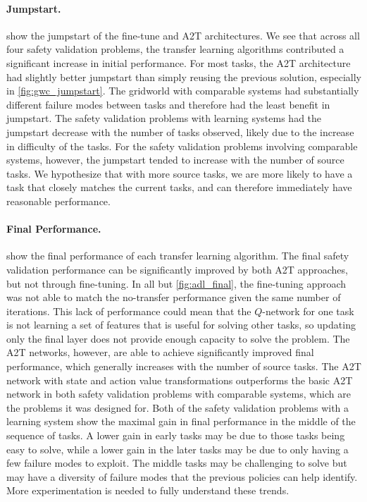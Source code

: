 \paragraph{Jumpstart.}
 show the jumpstart of the fine-tune and A2T architectures. We see that across all four safety validation problems, the transfer learning algorithms contributed a significant increase in initial performance. For most tasks, the A2T architecture had slightly better jumpstart than simply reusing the previous solution, especially in \cref{fig:gwc_jumpstart}. The gridworld with comparable systems had substantially different failure modes between tasks and therefore had the least benefit in jumpstart.  The safety validation problems with learning systems had the jumpstart decrease with the number of tasks observed, likely due to the increase in difficulty of the tasks. For the safety validation problems involving comparable systems, however, the jumpstart tended to increase with the number of source tasks. We hypothesize that with more source tasks, we are more likely to have a task that closely matches the current tasks, and can therefore immediately have reasonable performance. 

\paragraph{Final Performance.}
 show the final performance of each transfer learning algorithm. The final safety validation performance can be significantly improved by both A2T approaches, but not through fine-tuning. In all but \cref{fig:adl_final}, the fine-tuning approach was not able to match the no-transfer performance given the same number of iterations. This lack of performance could mean that the $Q$-network for one task is not learning a set of features that is useful for solving other tasks, so updating only the final layer does not provide enough capacity to solve the problem.  The A2T networks, however, are able to achieve significantly improved final performance, which generally increases with the number of source tasks. The A2T network with state and action value transformations outperforms the basic A2T network in both safety validation problems with comparable systems, which are the problems it was designed for. Both of the safety validation problems with a learning system show the maximal gain in final performance in the middle of the sequence of tasks. A lower gain in early tasks may be due to those tasks being easy to solve, while a lower gain in the later tasks may be due to only having a few failure modes to exploit. The middle tasks may be challenging to solve but may have a diversity of failure modes that the previous policies can help identify. More experimentation is needed to fully understand these trends. 

